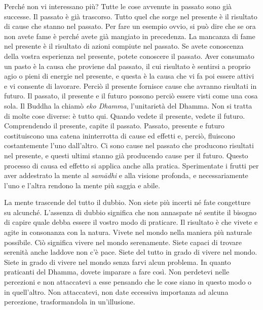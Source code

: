 Perché non vi interessano più? Tutte le cose avvenute in passato sono
già successe. Il passato è già trascorso. Tutto quel che sorge nel
presente è il risultato di cause che stanno nel passato. Per fare un
esempio ovvio, si può dire che se ora non avete fame è perché avete già
mangiato in precedenza. La mancanza di fame nel presente è il risultato
di azioni compiute nel passato. Se avete conoscenza della vostra
esperienza nel presente, potete conoscere il passato. Aver consumato un
pasto è la causa che proviene dal passato, il cui risultato è sentirsi a
proprio agio o pieni di energie nel presente, e questa è la causa che vi
fa poi essere attivi e vi consente di lavorare. Perciò il presente
fornisce cause che avranno risultati in futuro. Il passato, il presente
e il futuro possono perciò essere visti come una cosa sola. Il Buddha la
chiamò \emph{eko Dhamma}, l'unitarietà del Dhamma. Non si tratta di
molte cose diverse: è tutto qui. Quando vedete il presente, vedete il
futuro. Comprendendo il presente, capite il passato. Passato, presente e
futuro costituiscono una catena ininterrotta di cause ed effetti e,
perciò, fluiscono costantemente l'uno dall'altro. Ci sono cause nel
passato che producono risultati nel presente, e questi ultimi stanno già
producendo cause per il futuro. Questo processo di causa ed effetto si
applica anche alla pratica. Sperimentate i frutti per aver addestrato la
mente al \emph{samādhi} e alla visione profonda, e necessariamente l'uno
e l'altra rendono la mente più saggia e abile.

La mente trascende del tutto il dubbio. Non siete più incerti né fate
congetture su alcunché. L'assenza di dubbio significa che non annaspate
né sentite il bisogno di capire quale debba essere il vostro modo di
praticare. Il risultato è che vivete e agite in consonanza con la
natura. Vivete nel mondo nella maniera più naturale possibile. Ciò
significa vivere nel mondo serenamente. Siete capaci di trovare serenità
anche laddove non c'è pace. Siete del tutto in grado di vivere nel
mondo. Siete in grado di vivere nel mondo senza farvi alcun problema. In
quanto praticanti del Dhamma, dovete imparare a fare così. Non perdetevi
nelle percezioni e non attaccatevi a esse pensando che le cose siano in
questo modo o in quell'altro. Non attaccatevi, non date eccessiva
importanza ad alcuna percezione, trasformandola in un'illusione.


